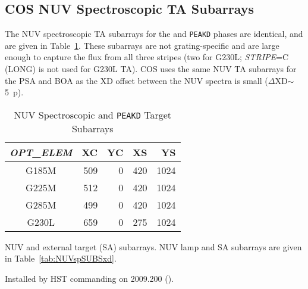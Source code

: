 \subsection{COS NUV Spectroscopic TA Subarrays}\label{subsec:NUVspSUBS}
The NUV spectroscopic TA subarrays for the  and \texttt{PEAKD} phases are identical, and are given in Table~\ref{tab:NUVspSUBSsad}.
These subarrays are not grating-specific and are large enough to capture the flux from all three stripes (two for G230L; \textit{STRIPE}=C (LONG) is not used for G230L TA).
COS uses the same NUV TA subarrays for the PSA and BOA as the XD offset between the NUV spectra is small ($\Delta$XD$\sim$5~p).
\begin{table}
\centering
	\begin{threeparttable}[tbc]
		\caption{NUV Spectroscopic  and \texttt{PEAKD} Target Subarrays}
		\begin{tabular*}{.75\linewidth}{@{\extracolsep{\fill}}c|rrrr}
			\toprule
			\textit{OPT\_ELEM}& XC & YC & XS & YS \\
			\midrule
			G185M&509&0&420&1024\\
			G225M&512&0&420&1024\\
			G285M&499&0&420&1024\\
			G230L&659&0&275&1024\\
			\bottomrule
		\end{tabular*}
		\footnotesize
		\begin{tablenotes}[para]
			\item [1] NUV  and  external target (SA) subarrays.
			 NUV  lamp and SA subarrays are given in Table~\ref{tab:NUVspSUBSxd}.
			\item [2] Installed by HST commanding on 2009.200 ().
		   \end{tablenotes}
		\label{tab:NUVspSUBSsad}
		\normalsize
	\end{threeparttable}
\end{table}

